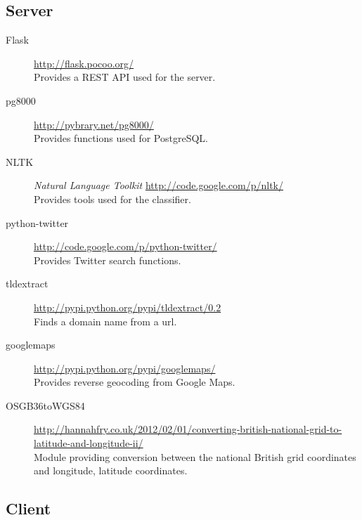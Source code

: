 \subsection{Server}

\begin{description}
    \item[Flask] \url{http://flask.pocoo.org/} \hfill \\
        Provides a REST API used for the server.
    \item[pg8000] \url{http://pybrary.net/pg8000/} \hfill \\
        Provides functions used for PostgreSQL.
    \item[NLTK] \emph{Natural Language Toolkit} \url{http://code.google.com/p/nltk/} \hfill \\
        Provides tools used for the classifier.
    \item[python-twitter] \url{http://code.google.com/p/python-twitter/} \hfill \\
        Provides Twitter search functions.
    \item[tldextract] \url{http://pypi.python.org/pypi/tldextract/0.2} \hfill \\
        Finds a domain name from a url.
    \item[googlemaps] \url{http://pypi.python.org/pypi/googlemaps/} \hfill \\
        Provides reverse geocoding from Google Maps.
    \item[OSGB36toWGS84] \url{http://hannahfry.co.uk/2012/02/01/converting-british-national-grid-to-latitude-and-longitude-ii/} \hfill \\
        Module providing conversion between the national British grid coordinates and longitude, latitude coordinates.
\end{description}

\subsection{Client}

